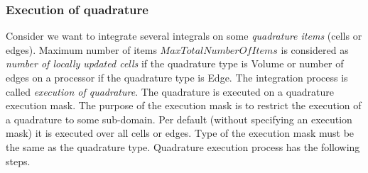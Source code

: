 \documentclass[BoSSSForSolvingConservationLaws.tex]{subfiles}
\begin{document}
\subsubsection*{Execution of quadrature}
Consider we want to integrate several integrals on some \emph{quadrature items} (cells or edges). Maximum number of items $MaxTotalNumberOfItems$ is considered as \emph{number of locally updated cells}  if the quadrature type is Volume or number of edges on a processor if the quadrature type is Edge. The integration process is called \emph{execution of quadrature}. The quadrature is executed on a quadrature execution mask. The purpose of the execution mask is to restrict the execution of a quadrature to some sub-domain. Per default (without specifying an execution mask) it is executed over all cells or edges. Type of the execution mask must be the same as the quadrature type. Quadrature execution process has the following steps.
\end{document}
